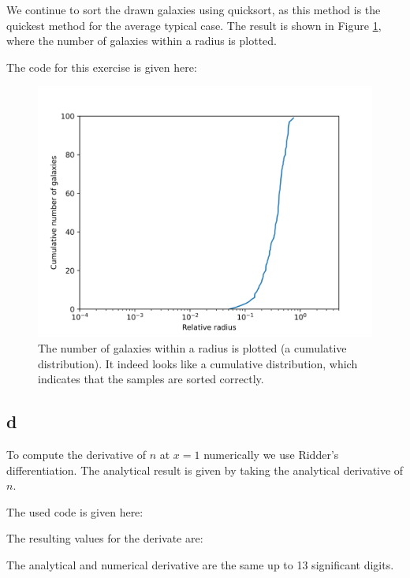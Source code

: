 We continue to sort the drawn galaxies using quicksort, as this method is the quickest method for the average typical case.
The result is shown in Figure \ref{fig:solc}, where the number of galaxies within a radius is plotted.

The code for this exercise is given here:


\begin{figure}[h!]
    \centering
    \includegraphics[width=0.9\linewidth]{./my_solution_1c.png}
    \caption{The number of galaxies within a radius is plotted (a cumulative distribution). It indeed looks like a cumulative distribution,
    which indicates that the samples are sorted correctly.}
    \label{fig:solc}
\end{figure}



\subsection{d}

To compute the derivative of $n$ at $x=1$ numerically we use Ridder's differentiation. The analytical result is given by taking the analytical derivative of $n$.

The used code is given here:


The resulting values for the derivate are:

The analytical and numerical derivative are the same up to 13 significant digits.